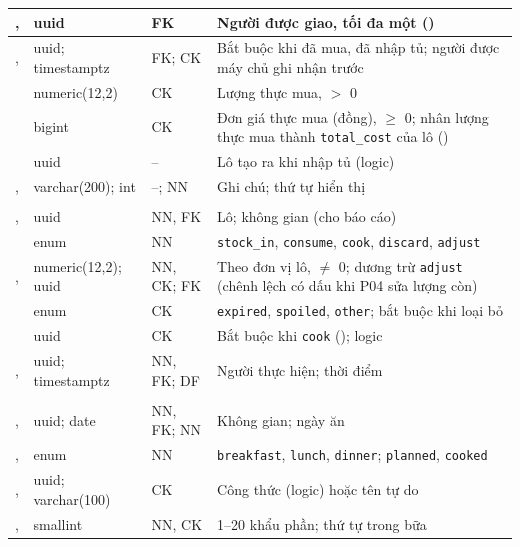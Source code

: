 {\begin{longtable}{|L{4.85cm}|L{2.5cm}|L{1.6cm}|L{\dimexpr{}\arrayrulewidth-4.85cm-2.5cm-1.6cm\relax}|}
,  & uuid & FK & Người được giao, tối đa một ()\\ \hline
{},  & uuid; timestamptz & FK; CK & Bắt buộc khi đã mua, đã nhập tủ; người được máy chủ ghi nhận trước\\ \hline
{} & numeric(12,2) & CK & Lượng thực mua, $>$ 0\\ \hline
{} & bigint & CK & Đơn giá thực mua (đồng), $\ge$ 0; nhân lượng thực mua thành \texttt{total\_cost} của lô ()\\ \hline
{} & uuid & -- & Lô tạo ra khi nhập tủ (logic)\\ \hline
{},  & varchar(200); int & --; NN & Ghi chú; thứ tự hiển thị\\ \hline
{}\\ \hline
{},  & uuid & NN, FK & Lô; không gian (cho báo cáo)\\ \hline
{} & enum & NN & \texttt{stock\_in}, \texttt{consume}, \texttt{cook}, \texttt{discard}, \texttt{adjust}\\ \hline
{},  & numeric(12,2); uuid & NN, CK; FK & Theo đơn vị lô, $\neq$ 0; dương trừ \texttt{adjust} (chênh lệch có dấu khi P04 sửa lượng còn)\\ \hline
{} & enum & CK & \texttt{expired}, \texttt{spoiled}, \texttt{other}; bắt buộc khi loại bỏ\\ \hline
{} & uuid & CK & Bắt buộc khi \texttt{cook} (); logic\\ \hline
{},  & uuid; timestamptz & NN, FK; DF & Người thực hiện; thời điểm\\ \hline
{}\\ \hline
{},  & uuid; date & NN, FK; NN & Không gian; ngày ăn\\ \hline
{},  & enum & NN & \texttt{breakfast}, \texttt{lunch}, \texttt{dinner}; \texttt{planned}, \texttt{cooked}\\ \hline
{},  & uuid; varchar(100) & CK & Công thức (logic) hoặc tên tự do\\ \hline
{},  & smallint & NN, CK & 1--20 khẩu phần; thứ tự trong bữa\\ \hline

\end{longtable}}

